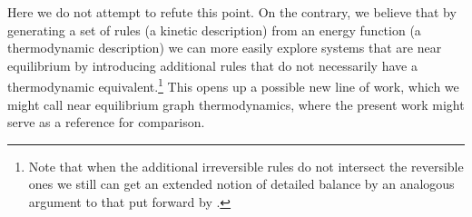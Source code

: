 Here we do not attempt to refute this point.
On the contrary, we believe that
by generating a set of rules (\ie a kinetic description)
from an energy function (\ie a thermodynamic description)
we can more easily explore systems that are near equilibrium
by introducing additional rules
that do not necessarily have a thermodynamic equivalent.\footnote{
  Note that when the additional irreversible rules do not intersect
  the reversible ones we still can get an extended notion
  of detailed balance by an analogous argument to
  that put forward by \citet{gorban}.}
This opens up a possible new line of work,
which we might call near equilibrium graph thermodynamics,
where the present work might serve as a reference for comparison.





